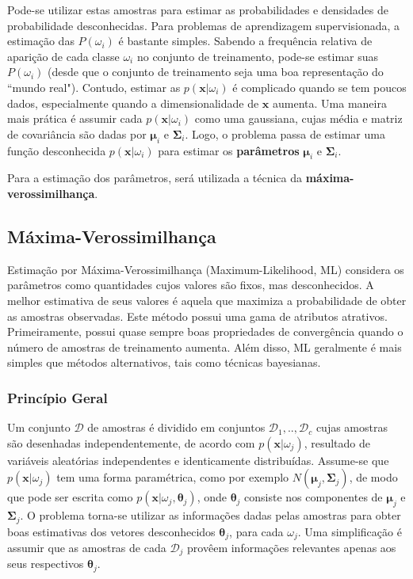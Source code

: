 Pode-se utilizar estas amostras para estimar as probabilidades e densidades de probabilidade desconhecidas. Para problemas de aprendizagem supervisionada, a estimação das $P(\omega_i)$ é bastante simples. Sabendo a frequência relativa de aparição de cada classe $\omega_i$ no conjunto de treinamento, pode-se estimar suas $P(\omega_i)$ (desde que o conjunto de treinamento seja uma boa representação do ``mundo real"). Contudo, estimar as $p(\boldsymbol{x}|\omega_i)$ é complicado quando se tem poucos dados, especialmente quando a dimensionalidade de $\boldsymbol{x}$ aumenta. Uma maneira mais prática é assumir cada $p(\boldsymbol{x}|\omega_i)$ como uma gaussiana, cujas média e matriz de covariância são dadas por $\boldsymbol{\mu}_i$ e $\boldsymbol{\Sigma}_i$. Logo, o problema passa de estimar uma função desconhecida $p(\boldsymbol{x}|\omega_i)$ para estimar os \textbf{parâmetros} $\boldsymbol{\mu}_i$ e $\boldsymbol{\Sigma}_i$.

Para a estimação dos parâmetros, será utilizada a técnica da \textbf{máxima-verossimilhança}.

\subsection{Máxima-Verossimilhança}

Estimação por Máxima-Verossimilhança (Maximum-Likelihood, ML) considera os parâmetros como quantidades cujos valores são fixos, mas desconhecidos. A melhor estimativa de seus valores é aquela que maximiza a probabilidade de obter as amostras observadas. Este método possui uma gama de atributos atrativos. Primeiramente, possui quase sempre boas propriedades de convergência quando o número de amostras de treinamento aumenta. Além disso, ML geralmente é mais simples que métodos alternativos, tais como técnicas bayesianas.

\subsubsection*{Princípio Geral}

Um conjunto $\mathcal{D}$ de amostras é dividido em conjuntos $\mathcal{D}_1, .., \mathcal{D}_c$ cujas amostras são desenhadas independentemente, de acordo com $p(\boldsymbol{x}|\omega_j)$, resultado de variáveis aleatórias independentes e identicamente distribuídas. Assume-se que $p(\boldsymbol{x}|\omega_j)$ tem uma forma paramétrica, como por exemplo $N(\boldsymbol{\mu}_j, \boldsymbol{\Sigma}_j)$, de modo que pode ser escrita como $p(\boldsymbol{x}|\omega_j, \boldsymbol{\theta}_j)$, onde $\boldsymbol{\theta}_j$ consiste nos componentes de $\boldsymbol{\mu}_j$ e $\boldsymbol{\Sigma}_j$. O problema torna-se utilizar as informações dadas pelas amostras para obter boas estimativas dos vetores desconhecidos $\boldsymbol{\theta}_j$, para cada $\omega_j$. Uma simplificação é assumir que as amostras de cada $\mathcal{D}_j$ provêem informações relevantes apenas aos seus respectivos $\boldsymbol{\theta}_j$.

